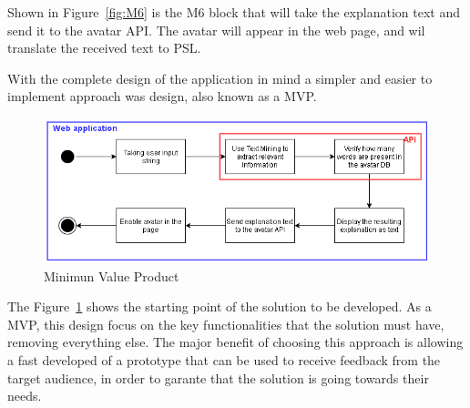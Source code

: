 Shown in Figure~\ref{fig:M6} is the M6 block that will take the explanation text and send it to the avatar \gls{API}.
The avatar will appear in the web page, and wil translate the received text to \gls{PSL}.

With the complete design of the application in mind a simpler and easier to implement approach was design, also known as a \gls{MVP}.

\begin{figure}[H]
\centering
\includegraphics[width=\textwidth,keepaspectratio]{ch4/assets/mvp_2.png}
\caption[Minimun Value Product]{Minimun Value Product}
\label{fig:mvp}
\end{figure}

The Figure~\ref{fig:mvp} shows the starting point of the solution to be developed.
As a \gls{MVP}, this design focus on the key functionalities that the solution must have, removing everything else.
The major benefit of choosing this approach is allowing a fast developed of a prototype that can be used to receive feedback from the target audience, in order to garante that the solution is going towards their needs.
